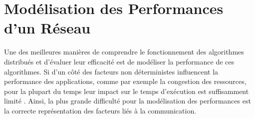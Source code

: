 \begin{resume}
%
%
%
%

\end{resume}

\section{Modélisation des Performances d'un Réseau\label{sec:reseaux-model}}


Une des meilleures manières de comprendre le fonctionnement des algorithmes
distribués et d'évaluer leur efficacité est de modéliser la performance
de ces algorithmes. Si d'un côté des facteurs non
déterministes influencent la performance des applications,
comme par exemple la congestion des ressources, pour la plupart du
temps leur impact sur le temps d'exécution est suffisamment
limité \cite{Grove03}. Ainsi, la plus grande difficulté pour la modélisation
des performances est la correcte représentation des facteurs liés
à la communication.  


